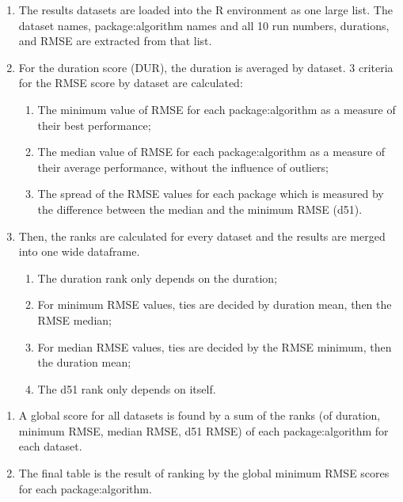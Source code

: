 \begin{enumerate}
\def\labelenumi{\arabic{enumi}.}
\tightlist
\item
  The results datasets are loaded into the R environment as one large
  list. The dataset names, package:algorithm names and all 10 run
  numbers, durations, and RMSE are extracted from that list.
\item
  For the duration score (DUR), the duration is averaged by dataset. 3
  criteria for the RMSE score by dataset are calculated:

  \begin{enumerate}
  \def\labelenumii{\alph{enumii}.}
  \tightlist
  \item
    The minimum value of RMSE for each package:algorithm as a measure of
    their best performance;
  \item
    The median value of RMSE for each package:algorithm as a measure of
    their average performance, without the influence of outliers;
  \item
    The spread of the RMSE values for each package which is measured by
    the difference between the median and the minimum RMSE (d51).
  \end{enumerate}
\item
  Then, the ranks are calculated for every dataset and the results are
  merged into one wide dataframe.

  \begin{enumerate}
  \def\labelenumii{\alph{enumii}.}
  \tightlist
  \item
    The duration rank only depends on the duration;
  \item
    For minimum RMSE values, ties are decided by duration mean, then the
    RMSE median;
  \item
    For median RMSE values, ties are decided by the RMSE minimum, then
    the duration mean;
  \item
    The d51 rank only depends on itself.
  \end{enumerate}
\end{enumerate}

\begin{enumerate}
\def\labelenumi{\arabic{enumi}.}
\setcounter{enumi}{3}
\tightlist
\item
  A global score for all datasets is found by a sum of the ranks (of
  duration, minimum RMSE, median RMSE, d51 RMSE) of each
  package:algorithm for each dataset.
\item
  The final table is the result of ranking by the global minimum RMSE
  scores for each package:algorithm.
\end{enumerate}

